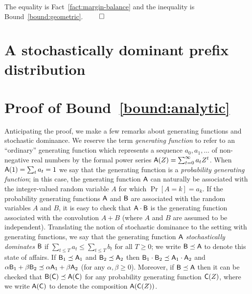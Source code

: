 The equality is Fact~\ref{fact:margin-balance} 
and the inequality is Bound~\ref{bound:geometric}. $\qed$





\section{A stochastically dominant prefix distribution}\label{sec:dominance-rho-stationary}
 

\section{Proof of Bound~\ref{bound:analytic}}\label{sec:gf-proof}

  Anticipating the proof, we make a few remarks about generating
  functions and stochastic dominance.  We reserve the term
  \emph{generating function} to refer to an ``ordinary'' generating
  function which represents a sequence $a_0, a_1, \ldots$ of
  non-negative real numbers by the formal power series
  $\mathsf{A}(Z) = \sum_{t = 0}^\infty a_t Z^t$. When
  $\mathsf{A}(1) = \sum_t a_t = 1$ we say that the generating function is
  a \emph{probability generating function}; in this case, the
  generating function $\mathsf{A}$ can naturally be associated with the
  integer-valued random variable $A$ for which $\Pr[A = k] = a_k$. If
  the probability generating functions $\mathsf{A}$ and $\mathsf{B}$ are
  associated with the random variables $A$ and $B$, it is easy to
  check that $\mathsf{A} \cdot \mathsf{B}$ is the generating function
  associated with the convolution $A + B$ (where $A$ and $B$ are
  assumed to be independent).  Translating the notion of stochastic
  dominance to the setting with generating functions, we say that the
  generating function $\mathsf{A}$ \emph{stochastically dominates}
  $\mathsf{B}$ if $\sum_{t \leq T} a_t \leq \sum_{t \leq T} b_t$ for all
  $T \geq 0$; we write $\mathsf{B} \preceq \mathsf{A}$ to denote this state of
  affairs. If $\mathsf{B}_1 \preceq \mathsf{A}_1$ and
  $\mathsf{B}_2 \preceq \mathsf{A}_2$ then
  $\mathsf{B}_1 \cdot \mathsf{B}_2 \preceq \mathsf{A}_1 \cdot \mathsf{A}_2$ and
  $\alpha \mathsf{B}_1 + \beta \mathsf{B}_2 \preceq \alpha \mathsf{A}_1 + \beta
  \mathsf{A}_2$ (for any $\alpha, \beta \geq 0$).  Moreover, if
  $\mathsf{B} \preceq \mathsf{A}$ then it can be checked that
  $\mathsf{B}(\mathsf{C}) \preceq \mathsf{A}(\mathsf{C})$ for any probability
  generating function $\mathsf{C}(Z)$, where we write $\mathsf{A}(\mathsf{C})$ to
  denote the composition $\mathsf{A}(\mathsf{C}(Z))$.


